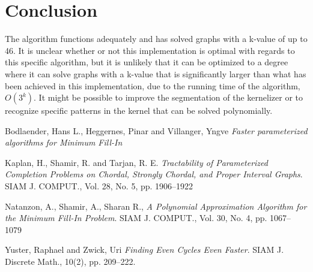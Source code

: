 \documentclass{article}
\begin{document}
	\section{Conclusion}
	The algorithm functions adequately and has solved graphs with a k-value of up to 46.
	It is unclear whether or not this implementation is optimal with regards to this specific algorithm, but it is unlikely that it can be optimized to a degree where it can solve graphs with a k-value that is significantly larger than what has been achieved in this implementation, due to the running time of the algorithm, $O(3^k)$.
	It might be possible to improve the segmentation of the kernelizer or to recognize specific patterns in the kernel that can be solved polynomially.

	\pagebreak
	
	\begin{thebibliography}{9}

		Bodlaender, Hans L., Heggernes, Pinar and Villanger, Yngve
		\textit{Faster parameterized algorithms for Minimum Fill-In}

		Kaplan, H., Shamir, R. and Tarjan, R. E. 
		\textit{Tractability of Parameterized Completion Problems on Chordal, Strongly Chordal, and Proper Interval Graphs}. 
		SIAM J. COMPUT., Vol. 28, No. 5, pp. 1906--1922

		Natanzon, A., Shamir, A., Sharan R.,
		\textit{A Polynomial Approximation Algorithm for the Minimum Fill-In Problem}. 
 		SIAM J. COMPUT., Vol. 30, No. 4, pp. 1067--1079

		Yuster, Raphael and Zwick, Uri
		\textit{Finding Even Cycles Even Faster}.
		SIAM J. Discrete Math., 10(2), pp. 209--222.		
		
	\end{thebibliography}

	\clearpage
\end{document}

